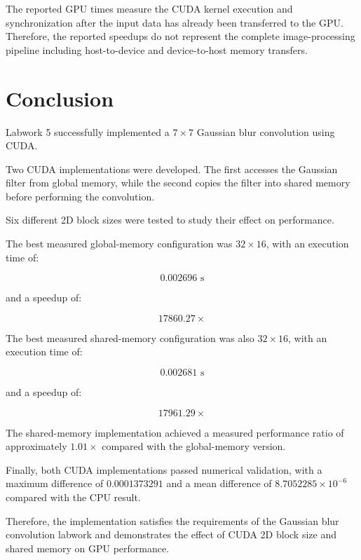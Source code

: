 \documentclass[11pt]{article}
\begin{document}
The reported GPU times measure the CUDA kernel execution and synchronization
after the input data has already been transferred to the GPU. Therefore,
the reported speedups do not represent the complete image-processing
pipeline including host-to-device and device-to-host memory transfers.

\section{Conclusion}

Labwork 5 successfully implemented a $7\times7$ Gaussian blur
convolution using CUDA.

Two CUDA implementations were developed. The first accesses the Gaussian
filter from global memory, while the second copies the filter into shared
memory before performing the convolution.

Six different 2D block sizes were tested to study their effect on
performance.

The best measured global-memory configuration was $32\times16$, with an
execution time of:

\[
\boxed{0.002696\text{ s}}
\]

and a speedup of:

\[
\boxed{17860.27\times}
\]

The best measured shared-memory configuration was also $32\times16$,
with an execution time of:

\[
\boxed{0.002681\text{ s}}
\]

and a speedup of:

\[
\boxed{17961.29\times}
\]

The shared-memory implementation achieved a measured performance ratio
of approximately $1.01\times$ compared with the global-memory version.

Finally, both CUDA implementations passed numerical validation, with a
maximum difference of $0.0001373291$ and a mean difference of
$8.7052285\times10^{-6}$ compared with the CPU result.

Therefore, the implementation satisfies the requirements of the
Gaussian blur convolution labwork and demonstrates the effect of CUDA
2D block size and shared memory on GPU performance.
\end{document}
